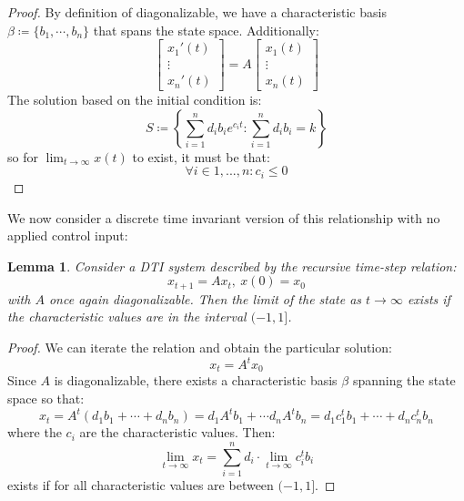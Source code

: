 \documentclass[10pt,letterpaper]{article} %
\newtheorem{lem}{Lemma}[section]
\begin{document}
\begin{proof}
By definition of diagonalizable, we have a characteristic basis $\beta \coloneq \{b_1, \cdots, b_n\}$ that spans the state space. Additionally:
\begin{equation*}
\begin{bmatrix}
x_1'(t)\\
\vdots\\
x_n'(t)  
\end{bmatrix} = A\begin{bmatrix}
x_1(t)\\
\vdots\\
x_n(t)
\end{bmatrix}
\end{equation*}
The solution based on the initial condition is:
\begin{equation*}
S \coloneq \left\{\sum_{i=1}^{n}d_ib_ie^{c_it} : \sum_{i=1}^{n}d_ib_i = k\right\}
\end{equation*}
so for $\lim_{t \xrightarrow{} \infty}x(t)$ to exist, it must be that:
\begin{equation*}
\forall i \in 1, ..., n: c_i \leqslant 0
\end{equation*}
\end{proof}
We now consider a discrete time invariant version of this relationship with no applied control input:
\begin{lem}
Consider a DTI system described by the recursive time-step relation:
\begin{equation*}
x_{t+1} = Ax_t, \ x(0) = x_0
\end{equation*}
with $A$ once again diagonalizable. Then the limit of the state as $t \xrightarrow{} \infty$ exists if the characteristic values are in the interval $(-1, 1]$. 
\end{lem}
\begin{proof}
We can iterate the relation and obtain the particular solution:
\begin{equation*}
x_t = A^tx_0
\end{equation*}
Since $A$ is diagonalizable, there exists a characteristic basis $\beta$ spanning the state space so that:
\begin{equation*}
x_t = A^t(d_1b_1 + \cdots + d_nb_n) = d_1A^tb_1 + \cdots d_nA^tb_n = d_1c_1^tb_1 + \cdots + d_nc_n^tb_n
\end{equation*}
where the $c_i$ are the characteristic values. Then:
\begin{equation*}
\lim_{t \xrightarrow{} \infty}x_t = \sum_{i=1}^{n}d_i \cdot \lim_{t \xrightarrow{} \infty}c_i^tb_i
\end{equation*}
exists if for all characteristic values are between $(-1, 1]$.
\end{proof}
\end{document}
